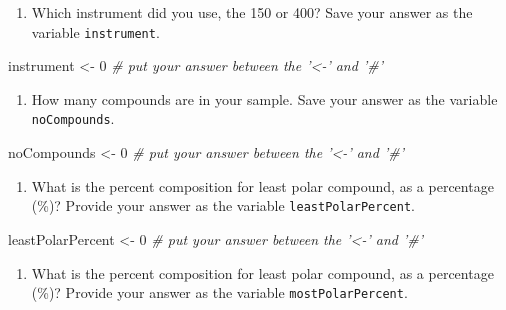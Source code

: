 \documentclass[]{tufte-book}
\newenvironment{Shaded}{}{}
\newcommand{\CommentTok}[1]{\textcolor[rgb]{0.38,0.63,0.69}{\textit{#1}}}
\newcommand{\DecValTok}[1]{\textcolor[rgb]{0.25,0.63,0.44}{#1}}
\newcommand{\NormalTok}[1]{#1}
\newcommand{\StringTok}[1]{\textcolor[rgb]{0.25,0.44,0.63}{#1}}
\providecommand{\tightlist}{%
  \setlength{\itemsep}{0pt}\setlength{\parskip}{0pt}}
\begin{document}
\begin{enumerate}
\def\labelenumi{\arabic{enumi}.}
\setcounter{enumi}{1}
\tightlist
\item
  Which instrument did you use, the 150 or 400? Save your answer as the variable \texttt{instrument}.
\end{enumerate}

\begin{Shaded}
\begin{Highlighting}[]
\NormalTok{instrument <-}\StringTok{ }\DecValTok{0}  \CommentTok{# put your answer between the '<-' and '#'}
\end{Highlighting}
\end{Shaded}

\begin{enumerate}
\def\labelenumi{\arabic{enumi}.}
\setcounter{enumi}{2}
\tightlist
\item
  How many compounds are in your sample. Save your answer as the variable \texttt{noCompounds}.
\end{enumerate}

\begin{Shaded}
\begin{Highlighting}[]
\NormalTok{noCompounds <-}\StringTok{ }\DecValTok{0}  \CommentTok{# put your answer between the '<-' and '#'}
\end{Highlighting}
\end{Shaded}

\begin{enumerate}
\def\labelenumi{\arabic{enumi}.}
\setcounter{enumi}{3}
\tightlist
\item
  What is the percent composition for least polar compound, as a percentage (\%)? Provide your answer as the variable \texttt{leastPolarPercent}.
\end{enumerate}

\begin{Shaded}
\begin{Highlighting}[]
\NormalTok{leastPolarPercent <-}\StringTok{ }\DecValTok{0}  \CommentTok{# put your answer between the '<-' and '#'}
\end{Highlighting}
\end{Shaded}

\begin{enumerate}
\def\labelenumi{\arabic{enumi}.}
\setcounter{enumi}{4}
\tightlist
\item
  What is the percent composition for least polar compound, as a percentage (\%)? Provide your answer as the variable \texttt{mostPolarPercent}.
\end{enumerate}
\end{document}
